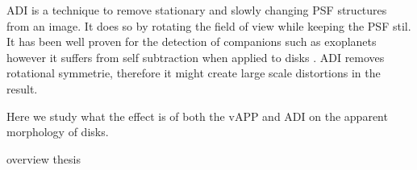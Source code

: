 \ac{ADI} is a technique to remove stationary and slowly changing \ac{PSF} structures from an image. It does so by rotating the field of view while keeping the \ac{PSF} stil. It has been well proven for the detection of companions such as exoplanets however it suffers from self subtraction when applied to disks \cite{self_sub1} \cite{self_sub2}. \ac{ADI} removes rotational symmetrie, therefore it might create large scale distortions in the result.

Here we study what the effect is of both the \ac{vAPP} and \ac{ADI} on the apparent morphology of disks.

overview thesis

